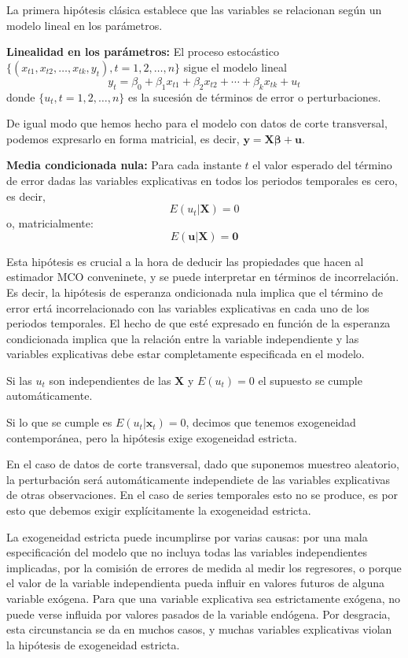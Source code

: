 La primera hip\'otesis cl\'asica establece que las variables se relacionan seg\'un un modelo lineal en los par\'ametros.

\begin{hipotesis}
\textbf{Linealidad en los par\'ametros:} El proceso estoc\'astico $\{(x_{t1},x_{t2},\ldots,x_{tk},y_t),t=1,2,\ldots,n\}$ sigue el modelo lineal
\[y_t=\beta_0+\beta_1x_{t1}+\beta_2x_{t2}+\cdots+\beta_kx_{tk}+u_t\]
donde $\{u_t,t=1,2,\ldots,n\}$ es la sucesi\'on de t\'erminos de error o perturbaciones.
\end{hipotesis}
 De igual modo que hemos hecho para el modelo con datos de corte transversal, podemos expresarlo en forma matricial, es decir, $\boldsymbol{y}=\boldsymbol{X\beta}+\boldsymbol{u}$.

\begin{hipotesis}
\textbf{Media condicionada nula:} Para cada instante $t$ el valor esperado del t\'ermino de error dadas las variables explicativas en todos los periodos temporales es cero, es decir,
\[E(u_t|\boldsymbol{X})=0\]
o, matricialmente:
\[E(\boldsymbol{u}|\boldsymbol{X})=\boldsymbol{0}\]
\end{hipotesis}

Esta hip\'otesis es crucial a la hora de deducir las propiedades que hacen al estimador MCO conveninete, y se puede interpretar en t\'erminos de incorrelaci\'on. Es decir, la hip\'otesis de esperanza ondicionada nula implica que el t\'ermino de error ert\'a incorrelacionado con las variables explicativas en cada uno de los periodos temporales. El hecho de que est\'e expresado en funci\'on de la esperanza condicionada implica que la relaci\'on entre la variable independiente y las variables explicativas debe estar completamente especificada en el modelo.

Si las $u_t$ son independientes de las $\boldsymbol{X}$ y $E(u_t)=0$ el supuesto se cumple autom\'aticamente.

Si lo que se cumple es $E(u_t|\boldsymbol{x}_t)=0$, decimos que tenemos exogeneidad contempor\'anea, pero la hip\'otesis exige exogeneidad estricta.

En el caso de datos de corte transversal, dado que suponemos muestreo aleatorio, la perturbaci\'on ser\'a autom\'aticamente independiete de las variables explicativas de otras observaciones. En el caso de series temporales esto no se produce, es por esto que debemos exigir expl\'icitamente la exogeneidad estricta.

La exogeneidad estricta puede incumplirse por varias causas: por una mala especificaci\'on del modelo que no incluya todas las variables independientes implicadas, por la comisi\'on de errores de medida al medir los regresores, o porque el valor de la variable independienta pueda influir en valores futuros de alguna variable ex\'ogena. Para que una variable explicativa sea estrictamente ex\'ogena, no puede verse influida por valores pasados de la variable end\'ogena. Por desgracia, esta circunstancia se da en muchos casos, y muchas variables explicativas violan la hip\'otesis de exogeneidad estricta.

